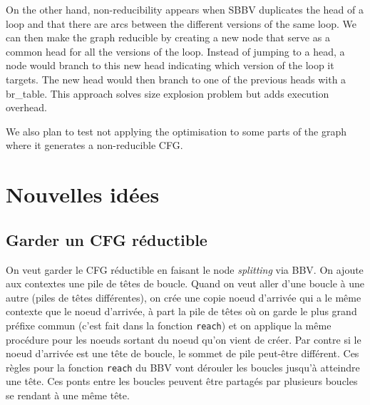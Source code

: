\documentclass[a4paper,11pt]{article}
\begin{document}
On the other hand, non-reducibility appears when SBBV duplicates the head of a
loop and that there are arcs between the different versions of the same loop. We
can then make the graph reducible by creating a new node that serve as a common
head for all the versions of the loop. Instead of jumping to a head, a node
would branch to this new head indicating which version of the loop it targets.
The new head would then branch to one of the previous heads with a
\textsf{br\_table}. This approach solves size explosion problem but adds
execution overhead.

We also plan to test not applying the optimisation to some parts of the graph
where it generates a non-reducible CFG.

\section{Nouvelles idées}
\subsection{Garder un CFG réductible}
On veut garder le CFG réductible en faisant le node \emph{splitting} via BBV\@.
On ajoute aux contextes une pile de têtes de boucle. Quand on veut aller d'une
boucle à une autre (piles de têtes différentes), on crée une copie noeud
d'arrivée qui a le même contexte que le noeud d'arrivée, à part la pile de têtes
où on garde le plus grand préfixe commun (c'est fait dans la fonction
\texttt{reach}) et on applique la même procédure pour les noeuds sortant du
noeud qu'on vient de créer. Par contre si le noeud d'arrivée est une tête de
boucle, le sommet de pile peut-être différent. Ces règles pour la fonction
\texttt{reach} du BBV vont dérouler les boucles jusqu'à atteindre une tête. Ces
ponts entre les boucles peuvent être partagés par plusieurs boucles se rendant à
une même tête.
\end{document}
